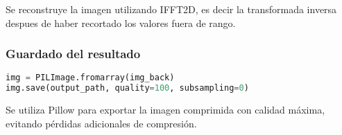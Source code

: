 Se reconstruye la imagen utilizando IFFT2D, es decir la transformada inversa despues de haber recortado los valores fuera de rango.

\subsubsection{Guardado del resultado}

\begin{lstlisting}[language=Python, caption={Guardado de la imagen comprimida}, label={lst:save_image}]
img = PILImage.fromarray(img_back)
img.save(output_path, quality=100, subsampling=0)
\end{lstlisting}

Se utiliza Pillow para exportar la imagen comprimida con calidad máxima, evitando pérdidas adicionales de compresión.
